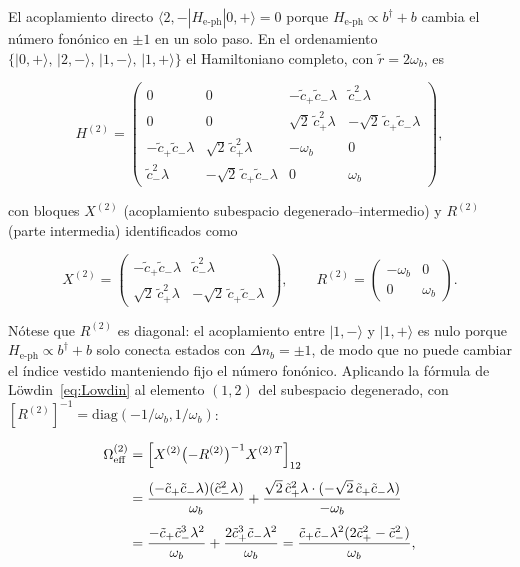 El acoplamiento directo $\langle 2,-|H_\mathrm{e\text{-}ph}|0,+\rangle = 0$ porque $H_\mathrm{e\text{-}ph} \propto b^\dagger + b$ cambia el número fonónico en $\pm 1$ en un solo paso. En el ordenamiento $\{|0,{+}\rangle,\,|2,{-}\rangle,\,|1,{-}\rangle,\,|1,{+}\rangle\}$ el Hamiltoniano completo, con $\tilde{r} = 2\omega_b$, es

\begin{equation}
	H^{(2)} = \begin{pmatrix}
		0 & 0
		& -\tilde{c}_+\tilde{c}_-\lambda
		& \tilde{c}_-^2\lambda \\[6pt]
		0 & 0
		& \sqrt{2}\,\tilde{c}_+^2\lambda
		& -\sqrt{2}\,\tilde{c}_+\tilde{c}_-\lambda \\[6pt]
		-\tilde{c}_+\tilde{c}_-\lambda & \sqrt{2}\,\tilde{c}_+^2\lambda
		& -\omega_b & 0 \\[6pt]
		\tilde{c}_-^2\lambda & -\sqrt{2}\,\tilde{c}_+\tilde{c}_-\lambda
		& 0 & \omega_b
	\end{pmatrix},
	\label{eq:H2_full}
\end{equation}

con bloques $X^{(2)}$ (acoplamiento subespacio degenerado--intermedio) y $R^{(2)}$ (parte intermedia) identificados como

\begin{equation}
	X^{(2)} = \begin{pmatrix}
		-\tilde{c}_+\tilde{c}_-\lambda & \tilde{c}_-^2\lambda \\[4pt]
		\sqrt{2}\,\tilde{c}_+^2\lambda & -\sqrt{2}\,\tilde{c}_+\tilde{c}_-\lambda
	\end{pmatrix},
	\qquad
	R^{(2)} = \begin{pmatrix} -\omega_b & 0 \\[2pt] 0 & \omega_b \end{pmatrix}.
	\label{eq:XR2}
\end{equation}

Nótese que $R^{(2)}$ es diagonal: el acoplamiento entre $|1,-\rangle$ y $|1,+\rangle$ es nulo porque $H_\mathrm{e\text{-}ph} \propto b^\dagger + b$ solo conecta estados con $\Delta n_b = \pm 1$, de modo que no puede cambiar el índice vestido manteniendo fijo el número fonónico. Aplicando la fórmula de Löwdin~\eqref{eq:Lowdin} al elemento $(1,2)$ del subespacio degenerado, con $[R^{(2)}]^{-1} = \mathrm{diag}(-1/\omega_b, 1/\omega_b)$:

\begin{align}
	\Omega_\mathrm{eff}^{(2)}
	&= \left[X^{(2)}\bigl(-R^{(2)}\bigr)^{-1}X^{(2)\,T}\right]_{12}
	\notag\\[4pt]
	&= \frac{(-\tilde{c}_+\tilde{c}_-\lambda)(\tilde{c}_-^2\lambda)}{\omega_b}
	+ \frac{\sqrt{2}\,\tilde{c}_+^2\lambda \cdot (-\sqrt{2}\,\tilde{c}_+\tilde{c}_-\lambda)}{-\omega_b}
	\notag\\[4pt]
	&= \frac{-\tilde{c}_+\tilde{c}_-^3\lambda^2}{\omega_b}
	+ \frac{2\tilde{c}_+^3\tilde{c}_-\lambda^2}{\omega_b}
	= \frac{\tilde{c}_+\tilde{c}_-\lambda^2(2\tilde{c}_+^2 - \tilde{c}_-^2)}{\omega_b},
	\label{eq:Oeff2_paso}
\end{align}

